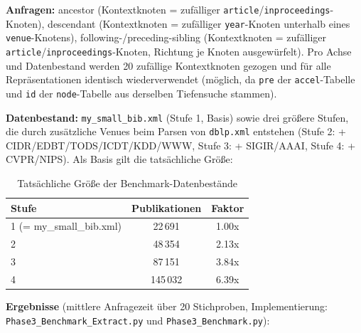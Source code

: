 \documentclass[11pt]{scrartcl}
\begin{document}
\textbf{Anfragen:} ancestor (Kontextknoten = zufälliger \texttt{article}/\texttt{inproceedings}-Knoten), descendant (Kontextknoten = zufälliger \texttt{year}-Knoten unterhalb eines \texttt{venue}-Knotens), following-/preceding-sibling (Kontextknoten = zufälliger \texttt{article}/\texttt{inproceedings}-Knoten, Richtung je Knoten ausgewürfelt). Pro Achse und Datenbestand werden 20 zufällige Kontextknoten gezogen und für alle Repräsentationen identisch wiederverwendet (möglich, da \texttt{pre} der \texttt{accel}-Tabelle und \texttt{id} der \texttt{node}-Tabelle aus derselben Tiefensuche stammen).

\textbf{Datenbestand:} \texttt{my\_small\_bib.xml} (Stufe 1, Basis) sowie drei größere Stufen, die durch zusätzliche Venues beim Parsen von \texttt{dblp.xml} entstehen (Stufe 2: + CIDR/EDBT/TODS/ICDT/KDD/WWW, Stufe 3: + SIGIR/AAAI, Stufe 4: + CVPR/NIPS). Als Basis gilt die tatsächliche Größe:

\begin{table}[h]
	\centering
	\begin{tabular}{l c c}
		\toprule
		Stufe & Publikationen & Faktor \\
		\midrule
		1 (= my\_small\_bib.xml) & 22\,691 & 1.00x \\
		2 & 48\,354  & 2.13x \\
		3 & 87\,151  & 3.84x \\
		4 & 145\,032 & 6.39x \\
		\bottomrule
	\end{tabular}
	\caption{Tatsächliche Größe der Benchmark-Datenbestände}
\end{table}

\textbf{Ergebnisse} (mittlere Anfragezeit über 20 Stichproben, Implementierung: \texttt{Phase3\_Benchmark\_Extract.py} und \texttt{Phase3\_Benchmark.py}):
\end{document}
